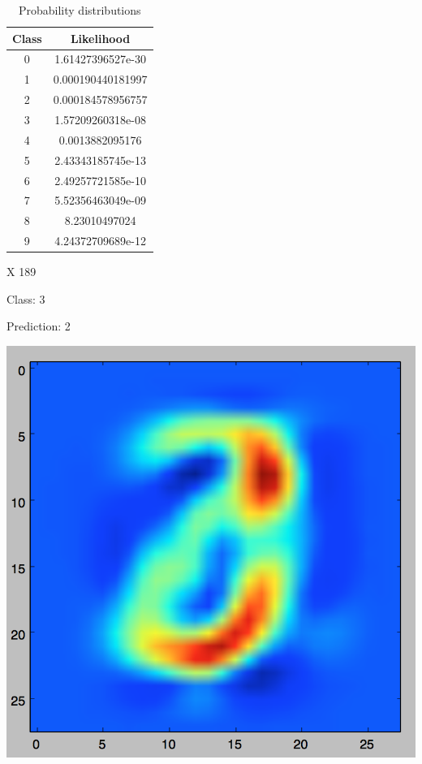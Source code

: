 \documentclass[11pt]{article}
\begin{document}
\begin{table}[!th]
\centering
\begin{tabular}{|c|c|}
\hline
Class & Likelihood \\
\hline
0 & 1.61427396527e-30 \\
1 & 0.000190440181997 \\
2 & 0.000184578956757 \\
3 & 1.57209260318e-08 \\
4 & 0.0013882095176 \\
5 & 2.43343185745e-13 \\
6 & 2.49257721585e-10 \\
7 & 5.52356463049e-09 \\
8 & 8.23010497024 \\
9 & 4.24372709689e-12 \\
\hline
\end{tabular}
\caption{Probability distributions}
\label{ex:table}
\end{table}

X 189

Class: 3

Prediction: 2

\includegraphics[scale=.3]{images/bayes_3_2.png}
\end{document}
